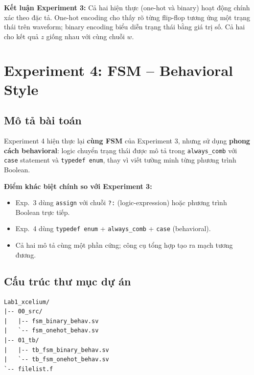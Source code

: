 \documentclass[12pt, a4paper]{article}
\begin{document}
\begin{resultbox}
\textbf{Kết luận Experiment 3:} Cả hai hiện thực (one-hot và binary) hoạt động chính xác theo đặc tả. One-hot encoding cho thấy rõ từng flip-flop tương ứng một trạng thái trên waveform; binary encoding biểu diễn trạng thái bằng giá trị số. Cả hai cho kết quả $z$ giống nhau với cùng chuỗi $w$.
\end{resultbox}

\section{Experiment 4: FSM -- Behavioral Style}
\label{sec:exp4}

\subsection{Mô tả bài toán}
\label{subsec:exp4-desc}

Experiment 4 hiện thực lại \textbf{cùng FSM} của Experiment 3, nhưng sử dụng \textbf{phong cách behavioral}: logic chuyển trạng thái được mô tả trong \texttt{always\_comb} với \texttt{case} statement và \texttt{typedef enum}, thay vì viết tường minh từng phương trình Boolean.

\begin{infobox}
\textbf{Điểm khác biệt chính so với Experiment 3:}
\begin{itemize}
    \item Exp.~3 dùng \texttt{assign} với chuỗi \texttt{?:} (logic-expression) hoặc phương trình Boolean trực tiếp.
    \item Exp.~4 dùng \texttt{typedef enum} + \texttt{always\_comb} + \texttt{case} (behavioral).
    \item Cả hai mô tả cùng một phần cứng; công cụ tổng hợp tạo ra mạch tương đương.
\end{itemize}
\end{infobox}

\subsection{Cấu trúc thư mục dự án}
\label{subsec:exp4-tree}

\begin{lstlisting}[style=bash_custom, caption={Cấu trúc thư mục Experiment 4.}]
Lab1_xcelium/
|-- 00_src/
|   |-- fsm_binary_behav.sv
|   `-- fsm_onehot_behav.sv
|-- 01_tb/
|   |-- tb_fsm_binary_behav.sv
|   `-- tb_fsm_onehot_behav.sv
`-- filelist.f
\end{lstlisting}
\end{document}

